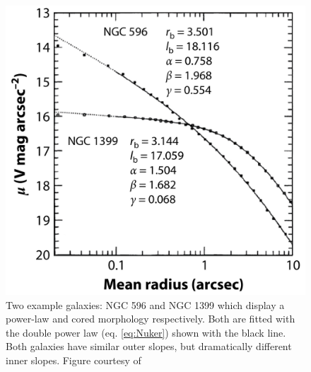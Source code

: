 	\begin{figure}
		\centering
		\includegraphics[width=\textwidth]{introduction/exampleCorePower.jpeg}
		\caption[Example cored and power-law surface brightness profile]{Two example galaxies: NGC 596 and NGC 1399 which display a power-law and cored morphology respectively. Both are fitted with the double power law (eq. \ref{eq:Nuker}) shown with the black line. Both galaxies have similar outer slopes, but dramatically different inner slopes. Figure courtesy of \citet{Lauer1995}}
		\label{fig:CorePower}
	\end{figure}

